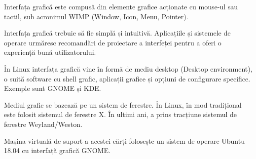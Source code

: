 Interfața grafică este compusă din elemente grafice acționate cu mouse-ul sau tactil, sub acronimul WIMP (Window, Icon, Menu, Pointer).

Interfața grafică trebuie să fie simplă și intuitivă. Aplicațiile și sistemele de operare urmăresc recomandări de proiectare a interfeței pentru a oferi o experiență bună utilizatorului.

În Linux interfața grafică vine în formă de mediu desktop (Desktop environment), o suită software cu shell grafic, aplicații grafice și opțiuni de configurare specifice. Exemple sunt GNOME și KDE.

Mediul grafic se bazează pe un sistem de ferestre. În Linux, în mod tradițional este folosit sistemul de ferestre X. În ultimi ani, a prins tracțiune sistemul de ferestre Weyland/Weston.

Mașina virtuală de suport a acestei cărți folosește un sistem de operare Ubuntu 18.04 cu interfață grafică GNOME.
